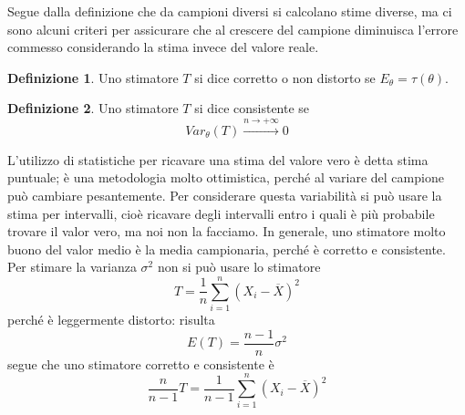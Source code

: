 \documentclass{article}
\theoremstyle{plain}
\theoremstyle{definition}
\newtheorem{definizione}{Definizione}[section]
\theoremstyle{remark}
\begin{document}
Segue dalla definizione che da campioni diversi si calcolano stime diverse, ma ci sono alcuni criteri per assicurare che al crescere del campione diminuisca l'errore commesso considerando la stima invece del valore reale.
\begin{definizione}
	Uno stimatore $T$ si dice corretto o non distorto se $E_{\theta}=\tau(\theta)$.
\end{definizione}
\begin{definizione}
	Uno stimatore $T$ si dice consistente se
	\begin{equation*}
		Var_\theta(T)\xrightarrow{n\to+\infty}0
	\end{equation*}
\end{definizione}
L'utilizzo di statistiche per ricavare una stima del valore vero è detta stima puntuale; è una metodologia molto ottimistica, perché al variare del campione può cambiare pesantemente. Per considerare questa variabilità si può usare la stima per intervalli, cioè ricavare degli intervalli entro i quali è più probabile trovare il valor vero, ma noi non la facciamo. In generale, uno stimatore molto buono del valor medio è la media campionaria, perché è corretto e consistente. Per stimare la varianza $\sigma^2$ non si può usare lo stimatore
\begin{equation*}
	T=\frac{1}{n}\sum_{i=1}^n(X_i-\overline{X})^2
\end{equation*}
perché è leggermente distorto: risulta
\begin{equation*}
	E(T)=\frac{n-1}{n}\sigma^2
\end{equation*}
segue che uno stimatore corretto e consistente è
\begin{equation*}
	\frac{n}{n-1}T=\frac{1}{n-1}\sum_{i=1}^n(X_i-\overline{X})^2
\end{equation*}
\end{document}
